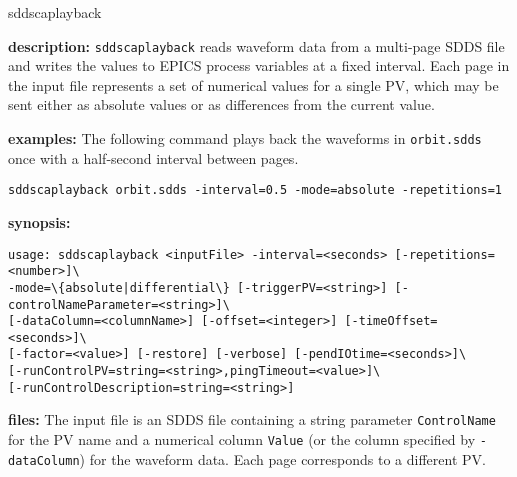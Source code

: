 %
%
\begin{sddsprog}{sddscaplayback}
\item \textbf{description:}
\verb+sddscaplayback+ reads waveform data from a multi-page SDDS file and writes the values to
EPICS process variables at a fixed interval. Each page in the input file represents a set of
numerical values for a single PV, which may be sent either as absolute values or as differences
from the current value.

\item \textbf{examples:}
The following command plays back the waveforms in \verb+orbit.sdds+ once with a half-second
interval between pages.
\begin{verbatim}
sddscaplayback orbit.sdds -interval=0.5 -mode=absolute -repetitions=1
\end{verbatim}

\item \textbf{synopsis:}
\begin{verbatim}
usage: sddscaplayback <inputFile> -interval=<seconds> [-repetitions=<number>]\
-mode=\{absolute|differential\} [-triggerPV=<string>] [-controlNameParameter=<string>]\
[-dataColumn=<columnName>] [-offset=<integer>] [-timeOffset=<seconds>]\
[-factor=<value>] [-restore] [-verbose] [-pendIOtime=<seconds>]\
[-runControlPV=string=<string>,pingTimeout=<value>]\
[-runControlDescription=string=<string>]
\end{verbatim}

\item \textbf{files:}
The input file is an SDDS file containing a string parameter \verb+ControlName+ for the PV name
and a numerical column \verb+Value+ (or the column specified by \verb+-dataColumn+) for the
waveform data. Each page corresponds to a different PV.


\end{sddsprog}

